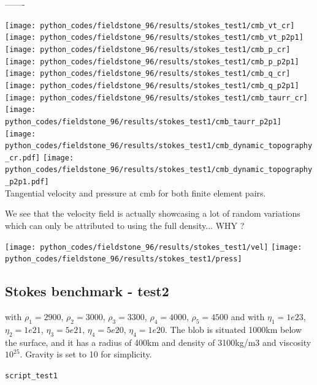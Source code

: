 -------

\begin{center}
\texttt{[image: python\_codes/fieldstone\_96/results/stokes\_test1/cmb\_vt\_cr]}
\texttt{[image: python\_codes/fieldstone\_96/results/stokes\_test1/cmb\_vt\_p2p1]}\\
\texttt{[image: python\_codes/fieldstone\_96/results/stokes\_test1/cmb\_p\_cr]}
\texttt{[image: python\_codes/fieldstone\_96/results/stokes\_test1/cmb\_p\_p2p1]}\\
\texttt{[image: python\_codes/fieldstone\_96/results/stokes\_test1/cmb\_q\_cr]}
\texttt{[image: python\_codes/fieldstone\_96/results/stokes\_test1/cmb\_q\_p2p1]}\\
\texttt{[image: python\_codes/fieldstone\_96/results/stokes\_test1/cmb\_taurr\_cr]}
\texttt{[image: python\_codes/fieldstone\_96/results/stokes\_test1/cmb\_taurr\_p2p1]}\\
\texttt{[image: python\_codes/fieldstone\_96/results/stokes\_test1/cmb\_dynamic\_topography\_cr.pdf]}
\texttt{[image: python\_codes/fieldstone\_96/results/stokes\_test1/cmb\_dynamic\_topography\_p2p1.pdf]}\\
{\captionfont Tangential velocity and pressure at cmb for both finite element pairs.}
\end{center}

We see that the velocity field is actually showcasing a lot of random variations
which can only be attributed to using the full density... WHY ? 


\begin{center}
\texttt{[image: python\_codes/fieldstone\_96/results/stokes\_test1/vel]}
\texttt{[image: python\_codes/fieldstone\_96/results/stokes\_test1/press]}
\end{center}






\newpage
\subsection*{Stokes benchmark - test2}


with $\rho_1=2900$,  $\rho_2=3000$,  $\rho_3=3300$, $\rho_4=4000$,  $\rho_5=4500$ and 
with $\eta_1=1e23$,  $\eta_2=1e21$,  $\eta_3=5e21$, $\eta_4=5e20$, $\eta_4=1e20$.
The blob is situated 1000km below the surface, and it has a radius of 400km and density of 3100kg/m3 and viscosity $10^{25}$.
Gravity is set to 10 for simplicity.

{\tt script\_test1}

